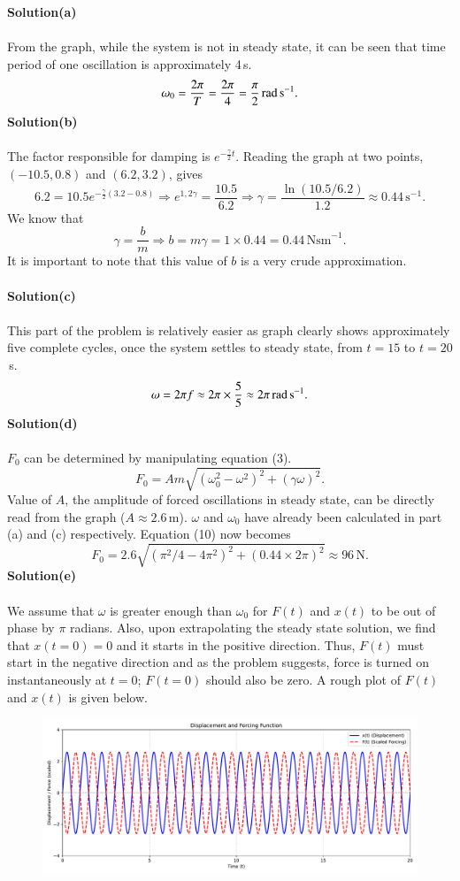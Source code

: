 \documentclass[12pt,a4paper]{article}
\begin{document}
\textbf{Solution(a)}
\\
\\From the graph, while the system is not in steady state, it can be seen that time period of one oscillation is approximately 4\,s.
\[\omega_0=\frac{2\pi}{T}=\frac{2\pi}{4}=\frac{\pi}{2}\,\text{rad\,s}^{-1}.\]
\textbf{Solution(b)}
\\
\\The factor responsible for damping is $e^{-\frac{\gamma}{2}t}$. Reading the graph at two points, $(-10.5,0.8)$ and $(6.2,3.2)$, gives
\[6.2=10.5e^{-\frac{\gamma}{2}(3.2-0.8)}\Rightarrow e^{1,2\gamma}=\frac{10.5}{6.2}\Rightarrow\gamma=\frac{\ln(10.5/6.2)}{1.2}\approx0.44\,\text{s}^{-1}.\]
We know that 
\[\gamma=\frac{b}{m}\Rightarrow b=m\gamma=1\times0.44=0.44\,\text{Nsm}^{-1}.\]
It is important to note that this value of $b$ is a very crude approximation.
\\
\\\textbf{Solution(c)}
\\
\\This part of the problem is relatively easier as graph clearly shows approximately five complete cycles, once the system settles to steady state, from $t=15$ to $t=20$\,s.
\[\omega=2\pi f\approx2\pi\times\frac{5}{5}\approx2\pi\,\text{rad\,s}^{-1}.\]
\textbf{Solution(d)}
\\
\\$F_0$ can be determined by manipulating equation (3).
\begin{equation}
    F_0=Am\sqrt{(\omega_0^2-\omega^2)^2+(\gamma\omega)^2}.
\end{equation}
Value of $A$, the amplitude of forced oscillations in steady state, can be directly read from the graph ($A\approx2.6\,$m). $\omega$ and $\omega_0$ have already been calculated in part (a) and (c) respectively. Equation (10) now becomes
\[F_0=2.6\sqrt{(\pi^2/4-4\pi^2)^2+(0.44\times2\pi)^2}\approx96\,\text{N}.\]
\textbf{Solution(e)}
\\
\\We assume that $\omega$ is greater enough than $\omega_0$ for $F(t)$ and $x(t)$ to be out of phase by $\pi$ radians. Also, upon extrapolating the steady state solution, we find that $x(t=0)=0$ and it starts in the positive direction. Thus, $F(t)$ must start in the negative direction and as the problem suggests, force is turned on instantaneously at $t=0$; $F(t=0)$ should also be zero. A rough plot of $F(t)$ and $x(t)$ is given below.
\begin{figure}[h!]
    \centering
    \includegraphics[width=1\linewidth]{figs/fig_sol_2.4e.pdf}
\end{figure}
\end{document}
